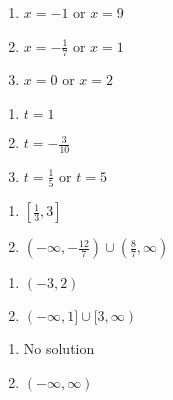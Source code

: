 \begin{multicols}{3} 
\begin{enumerate}
\setcounter{enumi}{\value{HW}}

\item $x = -1$ or $x = 9$

\item $x = -\frac{1}{7}$ or $x = 1$

\item $x = 0$ or $x = 2$

\setcounter{HW}{\value{enumi}}
\end{enumerate}
\end{multicols}

\begin{multicols}{3} 
\begin{enumerate}
\setcounter{enumi}{\value{HW}}

\item $t=1$

\item $t = -\frac{3}{10}$

\item $t = \frac{1}{5}$ or $t = 5$

\setcounter{HW}{\value{enumi}}
\end{enumerate}
\end{multicols}

\begin{multicols}{2}
\begin{enumerate}
\setcounter{enumi}{\value{HW}}

\item $\left[\frac{1}{3}, 3\right]$
\item $\left(-\infty, -\frac{12}{7} \right) \cup \left(\frac{8}{7}, \infty\right)$

\setcounter{HW}{\value{enumi}}
\end{enumerate}
\end{multicols}

\begin{multicols}{2}
\begin{enumerate}
\setcounter{enumi}{\value{HW}}

\item $(-3,2)$   
\item $(-\infty,1] \cup [3,\infty)$

\setcounter{HW}{\value{enumi}}
\end{enumerate}
\end{multicols}

\begin{multicols}{2}
\begin{enumerate}
\setcounter{enumi}{\value{HW}}

\item No solution  
\item $(-\infty, \infty)$

\setcounter{HW}{\value{enumi}}
\end{enumerate}
\end{multicols}

